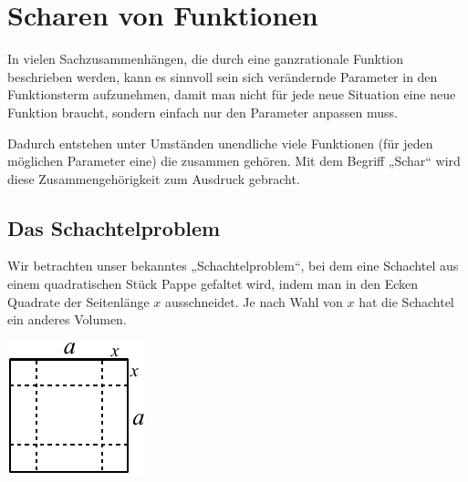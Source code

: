 \documentclass[12pt,a4paper,twoside,fleqn]{article}
\begin{document}
\tableofcontents

\newpage
\section{Scharen von Funktionen}
In vielen Sachzusammenhängen, die durch eine ganzrationale Funktion
beschrieben werden, kann es sinnvoll sein sich verändernde Parameter
in den Funktionsterm aufzunehmen, damit man nicht für jede neue
Situation eine neue Funktion braucht, sondern einfach nur den
Parameter anpassen muss.

Dadurch entstehen unter Umständen unendliche viele Funktionen (für
jeden möglichen Parameter eine) die zusammen gehören. Mit dem Begriff
„Schar“ wird diese Zusammengehörigkeit zum Ausdruck gebracht.

\subsection{Das Schachtelproblem}
\noindent\begin{minipage}[t]{.75\linewidth}
  Wir betrachten unser bekanntes „Schachtelproblem“, bei dem eine
  Schachtel aus einem quadratischen Stück Pappe gefaltet wird, indem
  man in den Ecken Quadrate der Seitenlänge $x$ ausschneidet. Je nach
  Wahl von $x$ hat die Schachtel ein anderes Volumen.
\end{minipage}\hfill
\begin{minipage}[t]{.2\linewidth}
  \vspace{-3\baselineskip}\includegraphics[width=\linewidth]{pics/1_schachtel_1}
\end{minipage}
\end{document}
